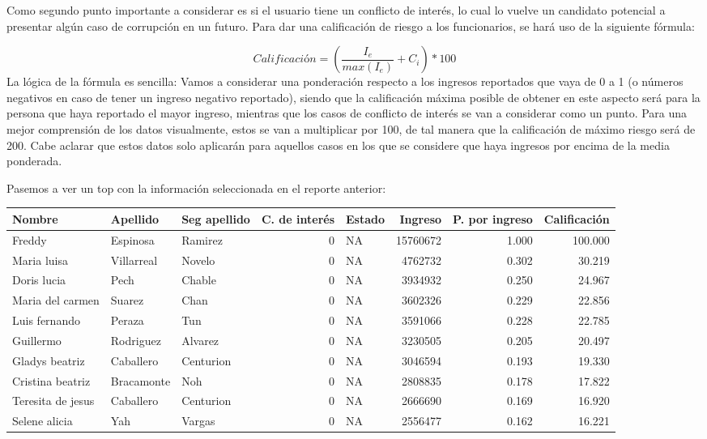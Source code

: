 \documentclass[10,a4paperpaper,]{article}
\begin{document}
Como segundo punto importante a considerar es si el usuario tiene un
conflicto de interés, lo cual lo vuelve un candidato potencial a
presentar algún caso de corrupción en un futuro. Para dar una
calificación de riesgo a los funcionarios, se hará uso de la siguiente
fórmula:

\[
Calificación = (\frac{I_e}{max (I_e)}+C_i)*100
\] La lógica de la fórmula es sencilla: Vamos a considerar una
ponderación respecto a los ingresos reportados que vaya de 0 a 1 (o
números negativos en caso de tener un ingreso negativo reportado),
siendo que la calificación máxima posible de obtener en este aspecto
será para la persona que haya reportado el mayor ingreso, mientras que
los casos de conflicto de interés se van a considerar como un punto.
Para una mejor comprensión de los datos visualmente, estos se van a
multiplicar por 100, de tal manera que la calificación de máximo riesgo
será de 200. Cabe aclarar que estos datos solo aplicarán para aquellos
casos en los que se considere que haya ingresos por encima de la media
ponderada.

Pasemos a ver un top con la información seleccionada en el reporte
anterior:

\begin{tabular}{l|l|l|r|l|r|r|r}
\hline
Nombre & Apellido & Seg apellido & C. de interés & Estado & Ingreso & P. por ingreso & Calificación\\
\hline
Freddy & Espinosa & Ramirez & 0 & NA & 15760672 & 1.000 & 100.000\\
\hline
Maria luisa & Villarreal & Novelo & 0 & NA & 4762732 & 0.302 & 30.219\\
\hline
Doris lucia & Pech & Chable & 0 & NA & 3934932 & 0.250 & 24.967\\
\hline
Maria del carmen & Suarez & Chan & 0 & NA & 3602326 & 0.229 & 22.856\\
\hline
Luis fernando & Peraza & Tun & 0 & NA & 3591066 & 0.228 & 22.785\\
\hline
Guillermo & Rodriguez & Alvarez & 0 & NA & 3230505 & 0.205 & 20.497\\
\hline
Gladys beatriz & Caballero & Centurion & 0 & NA & 3046594 & 0.193 & 19.330\\
\hline
Cristina beatriz & Bracamonte & Noh & 0 & NA & 2808835 & 0.178 & 17.822\\
\hline
Teresita de jesus & Caballero & Centurion & 0 & NA & 2666690 & 0.169 & 16.920\\
\hline
Selene alicia & Yah & Vargas & 0 & NA & 2556477 & 0.162 & 16.221\\
\hline
\end{tabular}
\end{document}
